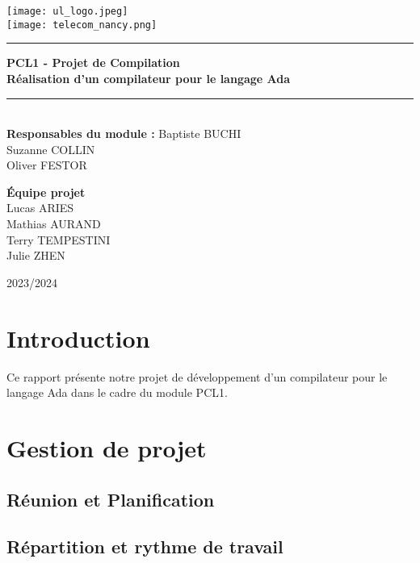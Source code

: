 \documentclass[12pt,titlepage]{report}
\begin{document}
\begin{titlepage}
\newcommand{\HRule}{\rule{\linewidth}{0.5mm}}
\center
\texttt{[image: ul\_logo.jpeg]} \\[0.6cm]
\texttt{[image: telecom\_nancy.png]} \\[0.2cm]
\HRule
{ \huge \bfseries PCL1 - Projet de Compilation \\
        \Large Réalisation d'un compilateur pour le langage Ada\\[0.15cm] }
\HRule \\[1cm]
{\LARGE \textbf{Responsables du module :}}
\vskip 0.1cm
{\Large 
Baptiste BUCHI\\
Suzanne COLLIN\\
Oliver FESTOR\\
} 


\vspace{1cm}
{\LARGE \textbf{Équipe projet}} \\ 
\vspace{0.1cm}
\Large Lucas ARIES\\
Mathias AURAND\\
Terry TEMPESTINI\\
Julie ZHEN\\
\vspace{3cm}
    
2023/2024 \\ [1cm]
\end{titlepage}

\tableofcontents
\clearpage
\chapter{Introduction}

Ce rapport présente notre projet de développement d'un compilateur pour le langage Ada dans le cadre du module PCL1.

\chapter{Gestion de projet}
\section{Réunion et Planification}
\section{Répartition et rythme de travail}
\end{document}
